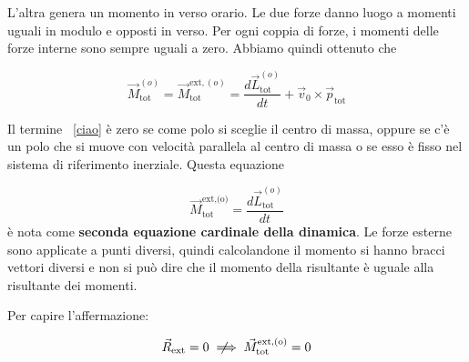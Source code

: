 \begin{figure}[htpb]
\end{figure}
\FloatBarrier
L'altra genera un momento in verso orario. Le due forze danno luogo a momenti uguali in modulo e opposti in verso. Per ogni coppia di forze, i momenti delle forze interne sono sempre uguali a zero. Abbiamo quindi ottenuto che

\[
\vec M_\text{tot}^{(o)}=\vec M_\text{tot}^{\text{ext},(o)}=\frac{d\vec L_\text{tot}^{(o)}}{dt}+\vec v_0 \times \vec p_\text{tot}
\]

Il termine ~\eqref{ciao} è zero se come polo si sceglie il centro di massa, oppure se c'è un polo che si muove con velocità parallela al centro di massa o se esso è fisso nel sistema di riferimento inerziale. Questa equazione

\[
	\boxed{\vec{M}_\text{tot}^\text{ext,(o)}=\frac{d\vec{L}_\text{tot}^{(o)}}{dt}}
\]
è nota come \textbf{seconda equazione cardinale della dinamica}. Le forze esterne sono applicate a punti diversi, quindi calcolandone il momento si hanno bracci vettori diversi e non si può dire che il momento della risultante è uguale alla risultante dei momenti.

Per capire l'affermazione:

\[
	\vec{R}_\text{ext}=0 \notimplies \vec{M}_\text{tot}^\text{ext,(o)}=0
\]

